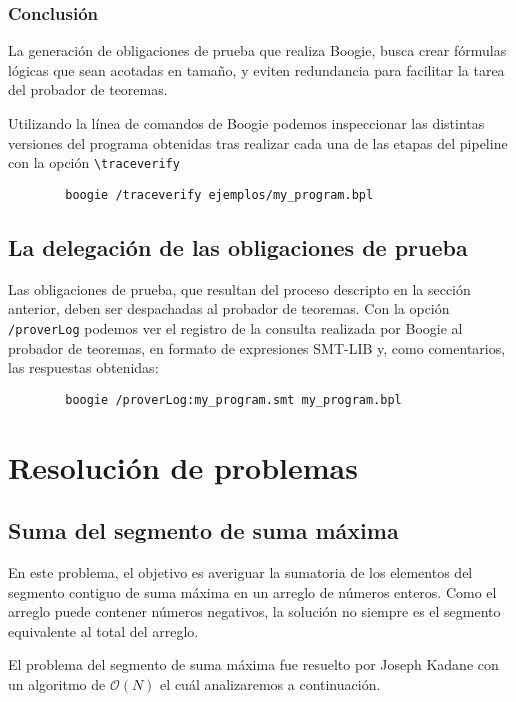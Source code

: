 \documentclass[12pt, a4paper, openany, fleqn]{book}
\begin{document}
    \subsection*{Conclusión}

    La generación de obligaciones de prueba que realiza Boogie, busca crear fórmulas lógicas que sean acotadas en tamaño, y eviten redundancia para facilitar la tarea del probador de teoremas.
  
    Utilizando la línea de comandos de Boogie podemos inspeccionar las distintas versiones del programa obtenidas tras realizar cada una de las etapas del pipeline con la opción \verb|\traceverify|
    \begin{verbatim}
        boogie /traceverify ejemplos/my_program.bpl
    \end{verbatim}

    \section{La delegación de las obligaciones de prueba}
    Las obligaciones de prueba, que resultan del proceso descripto en la sección anterior, deben ser despachadas al probador de teoremas.
    Con la opción \verb|/proverLog| podemos ver el registro de la consulta realizada por Boogie al probador de teoremas, en formato de expresiones SMT-LIB y, como comentarios, las respuestas obtenidas:
    \begin{verbatim}
        boogie /proverLog:my_program.smt my_program.bpl
    \end{verbatim}


    \chapter{Resolución de problemas}

    \section{Suma del segmento de suma máxima}

    En este problema, el objetivo es averiguar la sumatoria de los elementos del segmento contiguo de suma máxima en un arreglo de números enteros.
    Como el arreglo puede contener números negativos, la solución no siempre es el segmento equivalente al total del arreglo.

    El problema del segmento de suma máxima fue resuelto por Joseph Kadane con un algoritmo de $\mathcal{O}(N)$ el cuál analizaremos a continuación.
\end{document}
